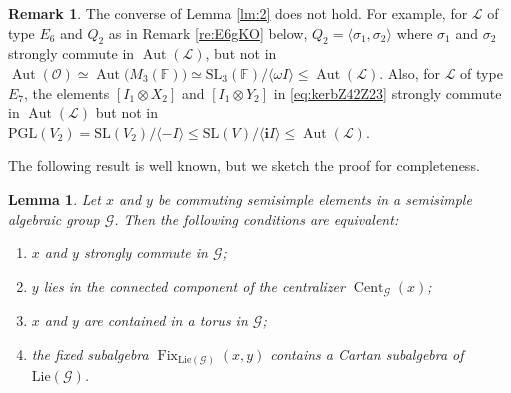 \documentclass[a4paper,reqno]{amsart}
\newtheorem{lemma}[theorem]{Lemma}
\theoremstyle{definition}
\newtheorem{remark}[theorem]{Remark}
\numberwithin{theorem}{section}
\numberwithin{equation}{section}
\begin{document}
\begin{remark}
The converse of Lemma \ref{lm:2} does not hold. For example, for ${\mathcal{L}}$ of type $E_6$ and $Q_2$ as in Remark \ref{re:E6gKO} below, $Q_2=\langle \sigma_1,\sigma_2\rangle$ where $\sigma_1$ and $\sigma_2$ strongly commute in $\operatorname{\mathrm{Aut}}({\mathcal{L}})$, but not in $\operatorname{\mathrm{Aut}}({\mathcal{O}})\simeq\operatorname{\mathrm{Aut}}\bigl(M_3({\mathbb{F}})\bigr)\simeq{\mathrm{SL}}_3({\mathbb{F}})/\langle\omega I\rangle\leq \operatorname{\mathrm{Aut}}({\mathcal{L}})$. Also, for ${\mathcal{L}}$ of type $E_7$,
the elements $[I_1\otimes X_2]$ and $[I_1\otimes Y_2]$ in \eqref{eq:kerbZ42Z23} strongly commute in $\operatorname{\mathrm{Aut}}({\mathcal{L}})$ but not in ${\mathrm{PGL}}(V_2)={\mathrm{SL}}(V_2)/\langle -I\rangle\leq {\mathrm{SL}}(V)/\langle{\mathbf{i}} I\rangle\leq \operatorname{\mathrm{Aut}}({\mathcal{L}})$.
\end{remark}

The following result is well known, but we sketch the proof for completeness.

\begin{lemma}\label{lm:3}
Let $x$ and $y$ be commuting semisimple elements in a semisimple algebraic group ${\mathcal{G}}$. Then the following conditions are equivalent:
\begin{enumerate}
\item $x$ and $y$ strongly commute in ${\mathcal{G}}$;
\item $y$ lies in the connected component of the centralizer $\operatorname{\mathrm{Cent}}_{\mathcal{G}}(x)$;
\item $x$ and $y$ are contained in a torus in ${\mathcal{G}}$;
\item the fixed subalgebra $\operatorname{\mathrm{Fix}}_{{\mathrm{Lie}}({\mathcal{G}})}(x,y)$ contains a Cartan subalgebra of ${\mathrm{Lie}}({\mathcal{G}})$.
\end{enumerate}
\end{lemma}
\end{document}
